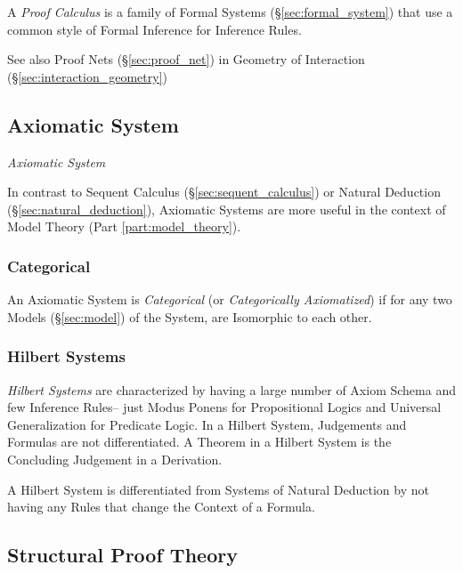 A \emph{Proof Calculus} is a family of Formal Systems
(\S\ref{sec:formal_system}) that use a common style of Formal
Inference for Inference Rules.

\fist See also Proof Nets (\S\ref{sec:proof_net}) in Geometry of
Interaction (\S\ref{sec:interaction_geometry})



\subsection{Axiomatic System} \label{sec:axiomatic_system}

\emph{Axiomatic System}

In contrast to Sequent Calculus (\S\ref{sec:sequent_calculus}) or
Natural Deduction (\S\ref{sec:natural_deduction}), Axiomatic Systems
are more useful in the context of Model Theory (Part
\ref{part:model_theory}).



\subsubsection{Categorical}\label{sec:categorical}

An Axiomatic System is \emph{Categorical} (or \emph{Categorically
  Axiomatized}) if for any two Models (\S\ref{sec:model}) of the
System, are Isomorphic to each other.



\subsubsection{Hilbert Systems}\label{sec:hilbert_system}

\emph{Hilbert Systems} are characterized by having a large number of
Axiom Schema and few Inference Rules-- just Modus Ponens for
Propositional Logics and Universal Generalization for Predicate
Logic. In a Hilbert System, Judgements and Formulas are not
differentiated. A Theorem in a Hilbert System is the Concluding
Judgement in a Derivation.

A Hilbert System is differentiated from Systems of Natural Deduction
by not having any Rules that change the Context of a Formula.



\subsection{Structural Proof Theory}\label{sec:structural_proof}

